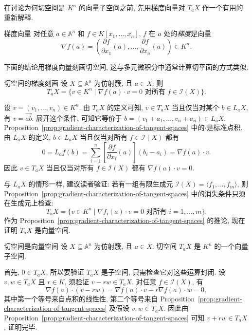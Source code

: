 在讨论为何切空间是 $K^{n}$ 的向量子空间之前, 先用梯度向量对 $T_{a}X$ 作一个有用的重新解释.

\begin{Definition}{梯度向量}\leavevmode\label{def:gradient-vector}
对任意 $a\in\mathbb{A}^{n}$ 和 $f\in K[x_{1},\ldots,x_{n}]$, $f$ 在 $a$ 处的\emph{梯度}是向量
\[
  \nabla f(a)=\left(\frac{\partial f}{\partial x_{1}}(a),\ldots,
    \frac{\partial f}{\partial x_{n}}(a)\right)\in K^{n}.
\]
\end{Definition}

下面的结论用梯度向量刻画切空间, 这与多元微积分中通常计算切平面的方式类似.

\begin{Proposition}{切空间的梯度刻画}\leavevmode\label{prop:gradient-characterization-of-tangent-spaces}
设 $X\subseteq\mathbb{A}^{n}$ 为仿射簇, 且 $a\in X$. 则
\[
  T_{a}X=\{v\in K^{n}\mid\nabla f(a)\cdot v=0\text{ 对所有 }f\in\mathcal{I}(X)\}.
\]
\end{Proposition}
\begin{Proof}
\BookPairedNoteLeft
  {设 $v=(v_{1},\ldots,v_{n})\in K^{n}$. 由 $T_{a}X$ 的定义可知, $v\in T_{a}X$ 当且仅当对某个 $b\in L_{a}X$, 有 $v=\overrightarrow{ab}$. 展开这个条件, 可知它等价于 $b=(v_{1}+a_{1},\ldots,v_{n}+a_{n})\in L_{a}X$.}
  {Proposition~\ref{prop:gradient-characterization-of-tangent-spaces} 中的\textquotedbl{}$\cdot$\textquotedbl{}是标准点积.}
由 $L_{a}X$ 的定义, $b\in L_{a}X$ 当且仅当对所有 $f\in\mathcal{I}(X)$ 都有
\[
  0=L_{a}f(b)=\sum_{i=1}^{n}\left[\frac{\partial f}{\partial x_{i}}(a)\right](b_{i}-a_{i})
    =\nabla f(a)\cdot v.
\]
因此 $v\in T_{a}X$ 当且仅当对所有 $f\in\mathcal{I}(X)$ 都有 $\nabla f(a)\cdot v=0$.
\end{Proof}

与 $L_{a}X$ 的情形一样, 建议读者验证: 若有一组有限生成元 $\mathcal{I}(X)=\langle f_{1},\ldots,f_{m}\rangle$, 则 Proposition~\ref{prop:gradient-characterization-of-tangent-spaces} 中的消失条件只须在生成元上检查:
\[
  T_{a}X=\{v\in K^{n}\mid\nabla f_{i}(a)\cdot v=0\text{ 对所有 }i=1,\ldots,m\}.
\]
作为 Proposition~\ref{prop:gradient-characterization-of-tangent-spaces} 的推论, 现在证明 $T_{a}X$ 是向量空间.

\begin{Corollary}{切空间是向量空间}\leavevmode\label{cor:tangent-space-is-vector-space}
设 $X\subseteq\mathbb{A}^{n}$ 为仿射簇, 且 $a\in X$. 切空间 $T_{a}X$ 是 $K^{n}$ 的一个向量子空间.
\end{Corollary}
\begin{Proof}
首先, $0\in T_{a}X$, 所以要验证 $T_{a}X$ 是子空间, 只需检查它对这些运算封闭. 设 $v,w\in T_{a}X$ 且 $r\in K$, 须验证 $v-rw\in T_{a}X$. 对任意 $f\in\mathcal{I}(X)$, 有
\[
  \nabla f(a)\cdot(v-rw)=\nabla f(a)\cdot v-r\nabla f(a)\cdot w=0,
\]
其中第一个等号来自点积的线性性, 第二个等号来自 Proposition~\ref{prop:gradient-characterization-of-tangent-spaces} 及假设 $v,w\in T_{a}X$. 因此由 Proposition~\ref{prop:gradient-characterization-of-tangent-spaces} 可知 $v+rw\in T_{a}X$, 证明完毕.
\end{Proof}

